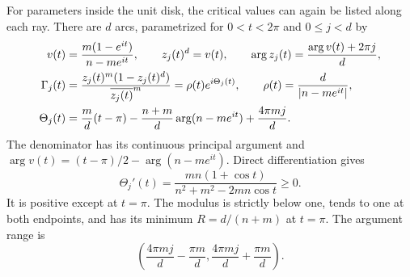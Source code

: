\documentclass[UTF8,11pt]{ctexart}
\theoremstyle{definition}
\numberwithin{equation}{section}
\begin{document}
For parameters inside the unit disk, the critical values can again
be listed along each ray. There are $d$ arcs, parametrized for
$0<t<2\pi$ and $0\le j<d$ by
\begin{align}
 v(t)&=\frac{m(1-e^{it})}{n-me^{it}},\qquad
 z_j(t)^d=v(t),\qquad
 \arg z_j(t)=\frac{\arg v(t)+2\pi j}{d},
 \label{v10:eq:arcs}\\
 \Gamma_j(t)&=\frac{z_j(t)^m(1-z_j(t)^d)}{\overline{z_j(t)}^{m}}
 =\rho(t)e^{i\Theta_j(t)},\qquad
 \rho(t)=\frac d{|n-me^{it}|},\notag\\
 \Theta_j(t)&=\frac md(t-\pi)
 -\frac{n+m}{d}\arg(n-me^{it})+\frac{4\pi mj}{d}.
 \notag
\end{align}
The denominator has its continuous principal argument and
$\arg v(t)=(t-\pi)/2-\arg(n-me^{it})$.
Direct differentiation gives
\begin{equation}\label{v10:eq:angularmonotonicity}
 \Theta_j'(t)=\frac{mn(1+\cos t)}{n^2+m^2-2mn\cos t}\ge0.
\end{equation}
It is positive except at $t=\pi$. The modulus is strictly below
one, tends to one at both endpoints, and has its minimum
$R=d/(n+m)$ at $t=\pi$. The argument range is
\begin{equation}\label{v10:eq:arcinterval}
 \left(\frac{4\pi mj}{d}-\frac{\pi m}{d},
       \frac{4\pi mj}{d}+\frac{\pi m}{d}\right).
\end{equation}
\end{document}
